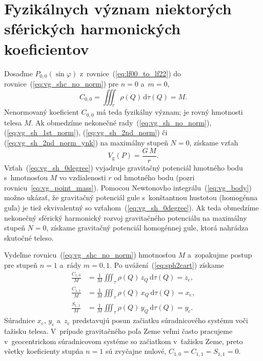 \documentclass[a4paper, 12pt]{book}
\newcommand{\diff}{\mathrm d}
\newcommand{\gidx}{\mathrm g}
\begin{document}

\section{Fyzikálnych význam niektorých sférických harmonických koeficientov}
\label{sec:physical_meaning_of_spherical_harmonic_coefficients}

Dosaďme $P_{0,0}(\sin\varphi)$ z~rovnice~(\ref{eq:lf00_to_lf22})
do rovnice~(\ref{eq:vg_shc_no_norm}) pre $n = 0$ a~$m = 0$,
%
\begin{equation}
C_{0,0} = \iiint_{\tau} \rho(Q) \, \diff \tau(Q) = M{.}
\end{equation}
%
Nenormovaný koeficient $C_{0,0}$ má teda fyzikálny význam; je rovný hmotnosti 
telesa $M$.  Ak obmedzíme nekonečné rady~(\ref{eq:vg_sh_no_norm}), 
(\ref{eq:vg_sh_1st_norm}), (\ref{eq:vg_sh_2nd_norm}) či 
(\ref{eq:vg_sh_2nd_norm_ynk}) na maximálny stupeň $N = 0$, získame vzťah
%
\begin{equation}
\label{eq:vg_sh_0degree}
V_\gidx(P) = \frac{G \, M}{r}{.}
\end{equation}
%
Vzťah~(\ref{eq:vg_sh_0degree}) vyjadruje gravitačný potenciál hmotného bodu 
s~hmotnosťou $M$ vo vzdialenosti $r$ od hmotného bodu (pozri 
rovnicu~\ref{eq:vg_point_mass}).  Pomocou Newtonovho 
integrálu~(\ref{eq:vg_body}) možno ukázať, že gravitačný potenciál gule 
s~konštantnou hustotou (homogénna guľa) je tiež ekvivalentný so 
vzťahom~(\ref{eq:vg_sh_0degree}).  Ak teda obmedzíme nekonečný sférický 
harmonický rozvoj gravitačného potenciálu na maximálny stupeň $N = 0$, získame 
gravitačný potenciál homogénnej gule, ktorá nahrádza skutočné teleso.

Vydeľme rovnicu~(\ref{eq:vg_shc_no_norm}) hmotnosťou $M$ a~zopakujme postup pre 
stupeň $n = 1$ a~rády $m = 0, 1$.  Po uvážení~(\ref{eq:sph2cart}) získame
%
\begin{equation}
\begin{split}
\frac{C_{1,0}}{M} &= \frac{1}{M} \iiint_{\tau} \rho(Q) \, z_Q \, \diff \tau(Q) 
= z_\mathrm{c}{,}\\
\frac{C_{1,1}}{M} &= \frac{1}{M} \iiint_{\tau} \rho(Q) \, x_Q \, \diff \tau(Q) 
= x_\mathrm{c}{,}\\
\frac{S_{1,1}}{M} &= \frac{1}{M} \iiint_{\tau} \rho(Q) \, y_Q \, \diff \tau(Q) 
= y_\mathrm{c}{.}
\end{split}
\end{equation}
%
Súradnice $x_\mathrm{c}$, $y_\mathrm{c}$ a~$z_\mathrm{c}$ predstavujú posun 
začiatku súradnicového systému voči ťažisku telesa.  V~prípade gravitačného 
poľa Zeme veľmi často pracujeme v~geocentrickom súradnicovom systéme so 
začiatkom v~ťažisku Zeme, preto všetky koeficienty stupňa $n = 1$ sú zvyčajne 
nulové, $C_{1,0} = C_{1,1} = S_{1,1} = 0$.
\end{document}
